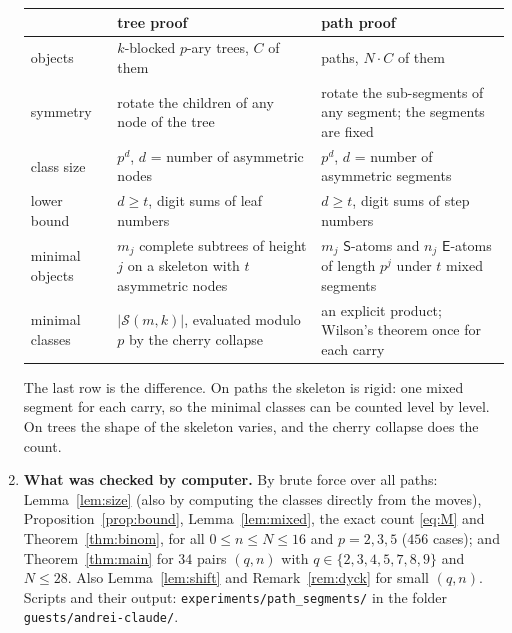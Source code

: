 \documentclass[11pt]{article}
\theoremstyle{definition}
\theoremstyle{remark}
\newcommand{\E}{\textsf{E}}
\newcommand{\Ss}{\textsf{S}}
\begin{document}
\begin{enumerate}[leftmargin=*,itemsep=4pt]
\nopagebreak[4]\smallskip
{\small
\begin{tabular}{@{}p{}p{}p{}@{}}
\toprule
 & tree proof & path proof\\
\midrule
objects & $k$-blocked $p$-ary trees, $C$ of them & paths, $N\cdot C$ of them\\
symmetry & rotate the children of any node of the tree & rotate the sub-segments of any segment; the segments are fixed\\
class size & $p^{d}$, $d$ = number of asymmetric nodes & $p^{d}$, $d$ = number of asymmetric segments\\
lower bound & $d\ge t$, digit sums of leaf numbers & $d\ge t$, digit sums of step numbers\\
minimal objects & $m_j$ complete subtrees of height $j$ on a skeleton with $t$ asymmetric nodes
 & $m_j$ $\Ss$-atoms and $n_j$ $\E$-atoms of length $p^j$ under $t$ mixed segments\\
minimal classes & $|\mathcal S(m,k)|$, evaluated modulo $p$ by the cherry collapse & an explicit product; Wilson's theorem once for each carry\\
\bottomrule
\end{tabular}}

\smallskip
The last row is the difference. On paths the skeleton is rigid: one mixed segment for each carry, so the minimal
classes can be counted level by level. On trees the shape of the skeleton varies, and the cherry collapse does
the count.

\item \textbf{What was checked by computer.} By brute force over all paths: Lemma~\ref{lem:size} (also by computing the
classes directly from the moves), Proposition~\ref{prop:bound}, Lemma~\ref{lem:mixed}, the exact count \eqref{eq:M}
and Theorem~\ref{thm:binom}, for all $0\le n\le N\le16$ and $p=2,3,5$ ($456$ cases); and Theorem~\ref{thm:main} for $34$
pairs $(q,n)$ with $q\in\{2,3,4,5,7,8,9\}$ and $N\le28$. Also Lemma~\ref{lem:shift} and
Remark~\ref{rem:dyck} for small $(q,n)$. Scripts and their output: \texttt{experiments/path\_segments/} in the folder \texttt{guests/andrei-claude/}.
\end{enumerate}
\end{document}
